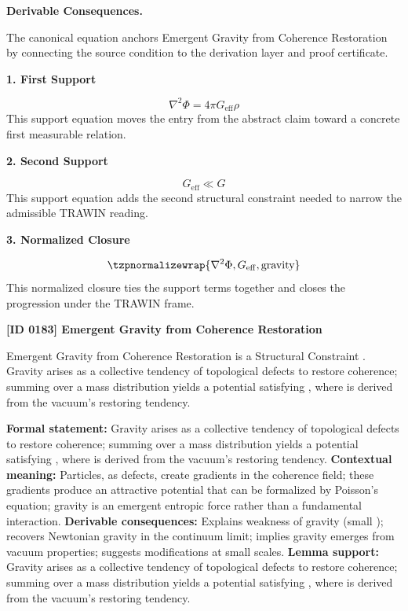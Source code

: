 \par\vspace{0.35em}
\noindent\textbf{Derivable Consequences.}\quad
\begingroup
\footnotesize
\raggedright
The canonical equation anchors Emergent Gravity from Coherence Restoration by connecting the source condition to the derivation layer and proof certificate.
\par\endgroup

\noindent\textbf{1. First Support}\par
\[
\nabla^2 \Phi = 4\pi G_{\mathrm{eff}}\rho
\]
\noindent This support equation moves the entry from the abstract claim toward a concrete first measurable relation.\par
\noindent\textbf{2. Second Support}\par
\[
G_{\mathrm{eff}} \ll G
\]
\noindent This support equation adds the second structural constraint needed to narrow the admissible TRAWIN reading.\par
\noindent\textbf{3. Normalized Closure}\par
\[
\tzpnormalizewrap{\nabla^2\Phi,G_{\mathrm{eff}},\text{gravity}}
\]
\noindent This normalized closure ties the support terms together and closes the progression under the TRAWIN frame.\par

\clearpage
\noindent\textbf{[ID 0183] Emergent Gravity from Coherence Restoration}\par
\vspace{0.35em}
\begingroup\small
{}
Emergent Gravity from Coherence Restoration is a Structural Constraint  . Gravity arises as a collective tendency of topological defects to restore coherence; summing over a mass distribution yields a potential satisfying , where is derived from the vacuum's restoring tendency.  

\begingroup\footnotesize\setlength{\emergencystretch}{3em}\sloppy
\textbf{Formal statement:} Gravity arises as a collective tendency of topological defects to restore coherence; summing over a mass distribution yields a potential satisfying , where is derived from the vacuum's restoring tendency.  
\textbf{Contextual meaning:} Particles, as defects, create gradients in the coherence field; these gradients produce an attractive potential that can be formalized by Poisson's equation; gravity is an emergent entropic force rather than a fundamental interaction.  
\textbf{Derivable consequences:} Explains weakness of gravity (small ); recovers Newtonian gravity in the continuum limit; implies gravity emerges from vacuum properties; suggests modifications at small scales.  
\textbf{Lemma support:} Gravity arises as a collective tendency of topological defects to restore coherence; summing over a mass distribution yields a potential satisfying , where is derived from the vacuum's restoring tendency.  \par
\endgroup

